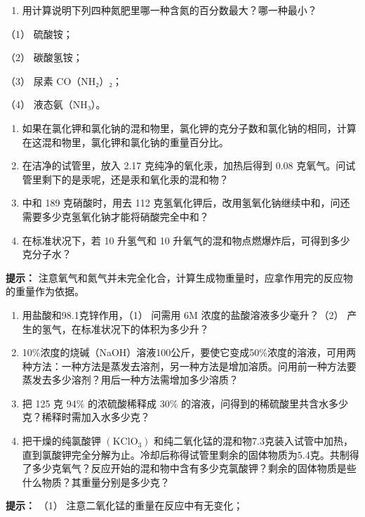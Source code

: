 \begin{enumerate}[start=12]
\item
  用计算说明下列四种氮肥里哪一种含氮的百分数最大？哪一种最小？
\end{enumerate}

（1） 硫酸铵；

（2） 碳酸氢铵；

（3） 尿素 CO（NH₂）₂；

（4） 液态氨（NH₃）。

\begin{enumerate}[start=13]
\item
  如果在氯化钾和氯化钠的混和物里，氯化钾的克分子数和氯化钠的相同，计算在这混和物里，氯化钾和氯化钠的重量百分比。
\item
  在洁净的试管里，放入 2.17 克纯净的氧化汞，加热后得到 0.08
  克氧气。问试管里剩下的是汞呢，还是汞和氧化汞的混和物？
\item
  中和 189 克硝酸时，用去 112
  克氢氧化钾后，改用氢氧化钠继续中和，问还需要多少克氢氧化钠才能将硝酸完全中和？
\item
  在标准状况下，若 10 升氢气和 10
  升氧气的混和物点燃爆炸后，可得到多少克分子水？
\end{enumerate}

\begin{shulihuadef}
\textbf{提示：}
注意氧气和氮气并未完全化合，计算生成物重量时，应拿作用完的反应物的重量作为依据。
\end{shulihuadef}

\begin{enumerate}[start=17]
\item
  用盐酸和98.1克锌作用，（1） 问需用 6M 浓度的盐酸溶液多少毫升？（2）
  产生的氢气，在标准状况下的体积为多少升？
\item
  10\%浓度的烧碱（NaOH）溶液100公斤，要使它变成50\%浓度的溶液，可用两种方法：一种方法是蒸发去溶剂，另一种方法是增加溶质。问用前一种方法要蒸发去多少溶剂？用后一种方法需增加多少溶质？
\item
  把 125 克 94\% 的浓硫酸稀释成 30\%
  的溶液，问得到的稀硫酸里共含水多少克？稀释时需加入水多少克？
\item
  把干燥的纯氯酸钾 \(\left(\mathrm{KClO}_{3}\right)\)
  和纯二氧化锰的混和物7.3克装入试管中加热，直到氯酸钾完全分解为止。冷却后称得试管里剩余的固体物质为5.4克。共制得了多少克氧气？反应开始的混和物中含有多少克氯酸钾？剩余的固体物质是些什么物质？其重量分别是多少克？
\end{enumerate}

\begin{shulihuadef}
\textbf{提示：} （1） 注意二氧化锰的重量在反应中有无变化；
\end{shulihuadef}

